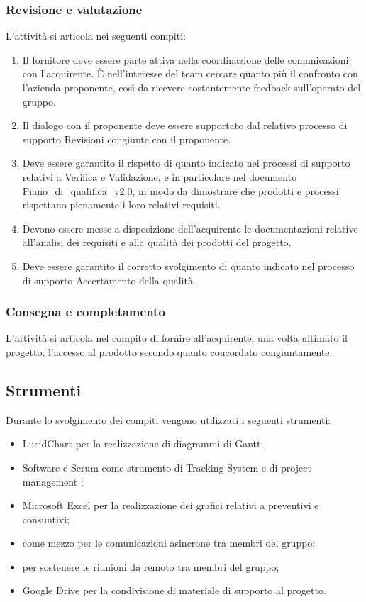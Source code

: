 \subsubsection{Revisione e valutazione}
L'attività si articola nei seguenti compiti:
\begin{enumerate}
    \item Il fornitore deve essere parte attiva nella coordinazione delle comunicazioni con l'acquirente. È nell'interesse del team cercare quanto più il confronto con l'azienda proponente, così da ricevere costantemente feedback sull'operato del gruppo.
    \item Il dialogo con il proponente deve essere supportato dal relativo processo di supporto Revisioni congiunte con il proponente.
    \item Deve essere garantito il rispetto di quanto indicato nei processi di supporto relativi a Verifica e Validazione, e in particolare nel documento Piano\_di\_qualifica\_v2.0, in modo da dimostrare che prodotti e processi rispettano pienamente i loro relativi requisiti.
    \item Devono essere messe a disposizione dell'acquirente le documentazioni relative all'analisi dei requisiti e alla qualità dei prodotti del progetto.
    \item Deve essere garantito il corretto svolgimento di quanto indicato nel processo di supporto Accertamento della qualità.
\end{enumerate}

\subsubsection{Consegna e completamento}
L'attività si articola nel compito di fornire all'acquirente, una volta ultimato il progetto, l'accesso al prodotto secondo quanto concordato congiuntamente.


\subsection{Strumenti}
Durante lo svolgimento dei compiti vengono utilizzati i seguenti strumenti:
\begin{itemize}
    \item LucidChart per la realizzazione di diagrammi di Gantt;
    \item {} Software e Scrum come strumento di  Tracking System e di project management ; 
    \item Microsoft Excel per la realizzazione dei grafici relativi a preventivi e consuntivi;
    \item {} come mezzo per le comunicazioni asincrone tra membri del gruppo;
    \item {} per sostenere le riunioni da remoto tra membri del gruppo;
    \item Google Drive per la condivisione di materiale di supporto al progetto.
\end{itemize}

